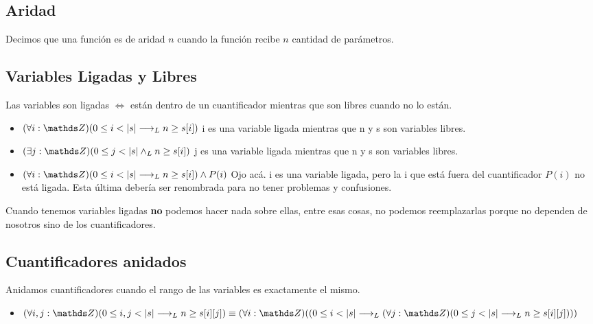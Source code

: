 \documentclass[10pt,a4paper]{article}
\begin{document}
\leavevmode
{}



\subsection*{Aridad}
Decimos que una función es de aridad \(n\) cuando la función recibe \(n\) cantidad de parámetros.

\subsection*{Variables Ligadas y Libres}
Las variables son ligadas \(\iff\) están dentro de un cuantificador mientras que son libres cuando no lo están.
\begin{itemize}
    \item \((\forall i: \ent)(0 \le i < \longitud{s} \implicaLuego n \ge s[i])\) i es una variable ligada mientras que n y s son variables libres.
    \item \((\exists j: \ent)(0 \le j < \longitud{s} \yLuego n \ge s[i])\) j es una variable ligada mientras que n y s son variables libres.
    \item \((\forall i: \ent)(0 \le i < \longitud{s} \implicaLuego n \ge s[i]) \land P(i)\) Ojo acá. i es una variable ligada, pero la i que está fuera del cuantificador \(P(i)\) no está ligada. Esta última debería ser renombrada para no tener problemas y confusiones.
\end{itemize}

Cuando tenemos variables ligadas \textbf{no} podemos hacer nada sobre ellas, entre esas cosas, no podemos reemplazarlas porque no dependen de nosotros sino de los cuantificadores.

\subsection*{Cuantificadores anidados}
Anidamos cuantificadores cuando el rango de las variables es exactamente el mismo.
\begin{itemize}
    \item \((\forall i, j: \ent)(0 \le i, j < \longitud{s} \implicaLuego n \ge s[i][j]) \equiv (\forall i: \ent)((0 \le i < \longitud{s}\implicaLuego (\forall  j: \ent)(0 \le j < \longitud{s} \implicaLuego n \ge s[i][j]))) \) 
\end{itemize}
\end{document}
